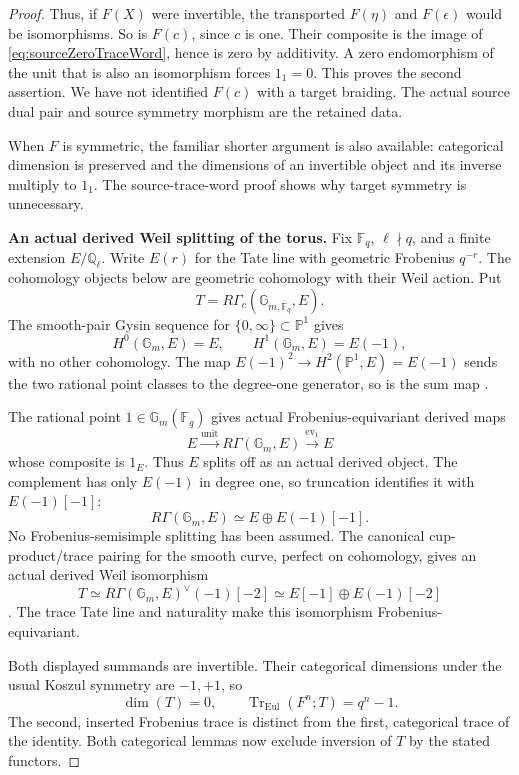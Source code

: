 \begin{proof}
Thus, if \(F(X)\) were invertible, the transported
\(F(\eta)\) and \(F(\epsilon)\) would be
isomorphisms. So is \(F(c)\), since \(c\) is one.
Their composite is the image of
\eqref{eq:sourceZeroTraceWord}, hence is zero
by additivity. A zero endomorphism of the unit
that is also an isomorphism forces \(1_1=0\).
This proves the second assertion.
We have not identified \(F(c)\) with a target
braiding. The actual source dual pair and source
symmetry morphism are the retained data.

When \(F\) is symmetric, the familiar shorter
argument is also available: categorical dimension
is preserved and the dimensions of an invertible
object and its inverse multiply to \(1_1\).
The source-trace-word proof shows why target
symmetry is unnecessary.

\par\smallskip\noindent\textbf{An actual derived Weil splitting of the torus.}\quad
Fix \(\mathbb F_q\), \(\ell\nmid q\), and a
finite extension \(E/\mathbb Q_\ell\).
Write \(E(r)\) for the Tate line with geometric
Frobenius \(q^{-r}\). The cohomology objects below
are geometric cohomology with their Weil action.
Put
\[
 T=R\Gamma_c(\mathbb G_{m,\overline{\mathbb F}_q},E).
\]
The smooth-pair Gysin sequence for
\(\{0,\infty\}\subset\mathbb P^1\) gives
\[
 H^0(\mathbb G_m,E)=E,\qquad
 H^1(\mathbb G_m,E)=E(-1),
\]
with no other cohomology. The map
\(E(-1)^2\to H^2(\mathbb P^1,E)=E(-1)\)
sends the two rational point classes to the
degree-one generator, so is the sum map
\cite[Theorem~16.1 and Corollary~16.2, p.~108;
Theorem~23.2, pp.~139--140;
Remark~24.2(b), p.~145]{Milne}.

The rational point \(1\in\mathbb G_m(\mathbb F_q)\)
gives actual Frobenius-equivariant derived maps
\[
 E\xrightarrow{\mathrm{unit}}R\Gamma(\mathbb G_m,E)
     \xrightarrow{\mathrm{ev}_1}E
\]
whose composite is \(1_E\).
Thus \(E\) splits off as an actual derived object.
The complement has only \(E(-1)\) in degree one,
so truncation identifies it with \(E(-1)[-1]\):
\[
 R\Gamma(\mathbb G_m,E)\simeq E\oplus E(-1)[-1].
\]
No Frobenius-semisimple splitting has been assumed.
The canonical cup-product/trace pairing for the
smooth curve, perfect on cohomology, gives an
actual derived Weil isomorphism
\[
 T\simeq R\Gamma(\mathbb G_m,E)^\vee(-1)[-2]
 \simeq E[-1]\oplus E(-1)[-2]
\]
\cite[Theorem~24.1(a),(b), p.~144]{Milne}.
The trace Tate line and naturality make this
isomorphism Frobenius-equivariant.

Both displayed summands are invertible.
Their categorical dimensions under the usual
Koszul symmetry are \(-1,+1\), so
\[
 \dim(T)=0,\qquad
 \operatorname{Tr}_{\mathrm{Eul}}(F^n;T)=q^n-1.
\]
The second, inserted Frobenius trace is distinct
from the first, categorical trace of the identity.
Both categorical lemmas now exclude inversion
of \(T\) by the stated functors.


\end{proof}
